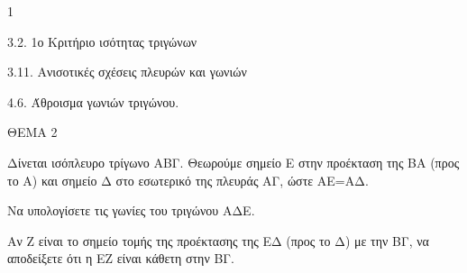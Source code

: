 \begin{ylh}{1}
    \item 3.2. 1ο Κριτήριο ισότητας τριγώνων
    \item 3.11. Ανισοτικές σχέσεις πλευρών και γωνιών
    \item 4.6. Άθροισμα γωνιών τριγώνου.
\end{ylh}

ΘΕΜΑ 2

Δίνεται ισόπλευρο τρίγωνο ΑΒΓ. Θεωρούμε σημείο Ε στην προέκταση της ΒΑ (προς το Α) και σημείο Δ στο εσωτερικό της πλευράς ΑΓ, ώστε ΑΕ=ΑΔ.

\begin{alist}
\item Να υπολογίσετε τις γωνίες του τριγώνου ΑΔΕ. 

\item Αν Ζ είναι το σημείο τομής της προέκτασης της ΕΔ (προς το Δ) με την ΒΓ, να αποδείξετε ότι η ΕΖ είναι κάθετη στην ΒΓ. 


\begin{center}
\end{center}
\end{alist}
